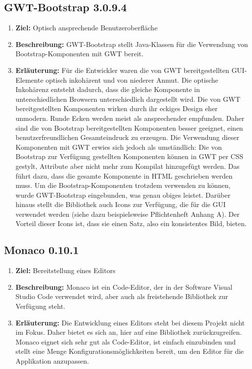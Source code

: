 \documentclass[parskip=full,11pt]{scrartcl}
\begin{document}
\subsection{GWT-Bootstrap 3.0.9.4}
\begin{enumerate}
\item[] \textbf{Ziel:} Optisch ansprechende Benutzeroberfläche
\item[] \textbf{Beschreibung:} GWT-Bootstrap stellt Java-Klassen für die Verwendung von Bootstrap-Komponenten mit GWT bereit.
\item[] \textbf{Erläuterung:} Für die Entwickler waren die von GWT bereitgestellten GUI-Elemente optisch inkohärent und von niederer Anmut.
Die optische Inkohärenz entsteht dadurch, dass die gleiche Komponente in unterschiedlichen Browsern unterschiedlich dargestellt wird.
Die von GWT bereitgestellten Komponenten wirken durch ihr eckiges Design eher unmodern.
Runde Ecken werden meist als ansprechender empfunden.
Daher sind die von Bootstrap bereitgestellten Komponenten besser geeignet, einen benutzerfreundlichen Gesamteindruck zu erzeugen.
Die Verwendung dieser Komponenten mit GWT erwies sich jedoch als umständlich:
Die von Bootstrap zur Verfügung gestellten Komponenten können in GWT per CSS gestylt, Attribute aber nicht mehr zum Kompilat hinzugefügt
werden. Das führt dazu, dass die gesamte Komponente in HTML geschrieben werden muss.
Um die Bootstrap-Komponenten trotzdem verwenden zu können, wurde GWT-Bootstrap eingebunden, was genau obiges leistet.
Darüber hinaus stellt die Bibliothek auch Icons zur Verfügung, die für die GUI verwendet werden (siehe dazu beispielsweise Pflichtenheft Anhang A).
Der Vorteil dieser Icons ist, dass sie einen Satz, also ein konsistentes Bild, bieten.
\end{enumerate}

\subsection{Monaco 0.10.1}
\begin{enumerate}
\item[] \textbf{Ziel:} Bereitstellung eines Editors
\item[] \textbf{Beschreibung:} Monaco ist ein Code-Editor, der in der Software Visual Studio Code verwendet wird, aber auch als freistehende
Bibliothek zur Verfügung steht.
\item[] \textbf{Erläuterung:} Die Entwicklung eines Editors steht bei diesem Projekt nicht im Fokus.  Daher bietet es sich an, hier auf eine Bibliothek zurückzugreifen.
Monaco eignet sich sehr gut als Code-Editor, ist einfach einzubinden und stellt
 eine Menge Konfigurationsmöglichkeiten bereit, um den Editor für die Applikation anzupassen.
\end{enumerate}
\end{document}

